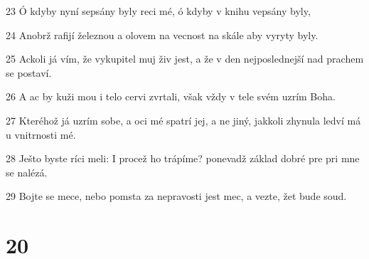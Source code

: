 \par 23 Ó kdyby nyní sepsány byly reci mé, ó kdyby v knihu vepsány byly,
\par 24 Anobrž rafijí železnou a olovem na vecnost na skále aby vyryty byly.
\par 25 Ackoli já vím, že vykupitel muj živ jest, a že v den nejposlednejší nad prachem se postaví.
\par 26 A ac by kuži mou i telo cervi zvrtali, však vždy v tele svém uzrím Boha.
\par 27 Kteréhož já uzrím sobe, a oci mé spatrí jej, a ne jiný, jakkoli zhynula ledví má u vnitrnosti mé.
\par 28 Ješto byste ríci meli: I procež ho trápíme? ponevadž základ dobré pre pri mne se nalézá.
\par 29 Bojte se mece, nebo pomsta za nepravosti jest mec, a vezte, žet bude soud.

\chapter{20}

